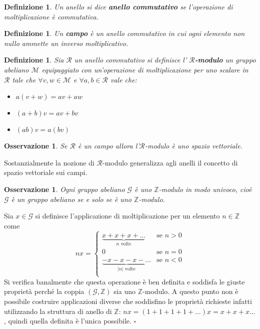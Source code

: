 \documentclass[10pt, twoside=false, x11names]{scrbook}
\newtheorem{osservation}[theorem]{Osservazione}
\newtheorem{definition}[theorem]{Definizione}
\newenvironment{proof}{{\textbf{Dimostrazione}:}}{\hfill $\square$}
\newcommand{\R}{\mathcal{R}}
\newcommand{\M}{\mathcal{M}}
\newcommand{\Z}{\mathbb{Z}}
\begin{document}
\begin{definition}
  Un anello si dice \textbf{anello commutativo}  se l'operazione di moltiplicazione
  è commutativa.
\end{definition}

\begin{definition}
  Un \textbf{campo}  è un anello commutativo in cui ogni elemento non nullo ammette
  un inverso moltiplicativo.
\end{definition}

\begin{definition}
  Sia $ \R $ un anello commutativo si definisce l' \textbf{$ \R $-modulo} \index{$ \R $-modulo}
  un gruppo abeliano $ \M $ equipaggiato con un'operazione di moltiplicazione per uno scalare in $ \R $
  tale che $ \forall v,w \in \M $ e $ \forall a,b \in \R $ vale che:
  \begin{itemize}
  \item $ a(v + w) = av + aw $
  \item $ (a + b)v = av + bv $
  \item $ (ab)v = a(bv) $
  \end{itemize}
\end{definition}

\begin{osservation}
  Se $ \R $ è un campo allora l'$ \R $-modulo è uno spazio vettoriale.
\end{osservation}
Sostanzialmente la nozione di $ \R $-modulo generalizza agli anelli il concetto di spazio vettoriale sui campi.

\begin{osservation}
  Ogni gruppo abeliano $ \mathcal{G} $ è uno $ \Z $-modulo in modo univoco, cioè $ \mathcal{G} $ è un
  gruppo abeliano se e solo se è uno $ \Z $-modulo.
\end{osservation}
\begin{proof}
  Sia $ x \in \mathcal{G} $ si definisce l'applicazione di moltiplicazione per un elemento $ n \in \Z $ come
  \[
    nx =
    \begin{cases}
      \underbrace{ x + x + x + \dots}_{n \text{ volte}} & \text{se } n > 0 \\
      0 & \text{se } n = 0 \\
      \underbrace{ - x - x - x - \dots}_{|n| \text{ volte}} & \text{se } n < 0 \\
    \end{cases}
  \]
  Si verifica banalmente che questa operazione è ben definita e soddisfa
  le giuste proprietà perché la coppia $ (\mathcal{G}, \Z) $ sia uno $ \Z $-modulo.
  A questo punto non è possibile costruire applicazioni diverse che soddisfino le
  proprietà richieste infatti utilizzando la struttura di anello di $ \Z $:
  $ n x = (1 + 1 + 1 + 1 + \dots) x = x + x + x \dots $, quindi quella definita
  è l'unica possibile.
\end{proof}
\end{document}
